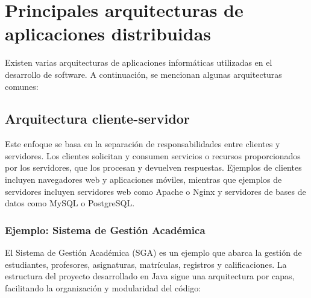 	\section{Principales arquitecturas de aplicaciones distribuidas}
	Existen varias arquitecturas de aplicaciones informáticas utilizadas en el desarrollo de software. A continuación, se mencionan algunas arquitecturas comunes:
	
	\subsection{Arquitectura cliente-servidor}
	Este enfoque se basa en la separación de responsabilidades entre clientes y servidores. Los clientes solicitan y consumen servicios o recursos proporcionados por los servidores, que los procesan y devuelven respuestas. Ejemplos de clientes incluyen navegadores web y aplicaciones móviles, mientras que ejemplos de servidores incluyen servidores web como Apache o Nginx y servidores de bases de datos como MySQL o PostgreSQL.
	
	\subsubsection{Ejemplo: Sistema de Gestión Académica}
	El Sistema de Gestión Académica (SGA) es un ejemplo que abarca la gestión de estudiantes, profesores, asignaturas, matrículas, registros y calificaciones. La estructura del proyecto desarrollado en Java sigue una arquitectura por capas, facilitando la organización y modularidad del código:
	
